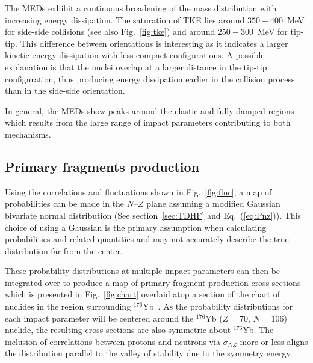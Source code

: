 The MEDs exhibit a continuous broadening of the mass distribution with increasing energy dissipation. 
The saturation of TKE lies around $350-400$~MeV for side-side collisions (see also Fig.~\ref{fig:tke}) and around $250-300$~MeV for tip-tip. 
This difference between orientations is interesting as it indicates a larger kinetic energy dissipation with less compact configurations. 
A possible explanation is that the nuclei overlap at a larger distance in the tip-tip configuration, thus producing energy dissipation earlier in the collision process than in the side-side orientation. 

In general, the MEDs show peaks around the elastic and fully damped regions which results from the large range of impact parameters contributing to both mechanisms.

\subsection{Primary fragments production}

Using the  correlations and fluctuations shown in Fig.~\ref{fig:fluc}, a map of probabilities can be made in the $N$--$Z$ plane assuming a modified Gaussian bivariate normal distribution (See section~\ref{sec:TDHF} and Eq.~(\ref{eq:Pnz})).
This choice of using a Gaussian is the primary assumption when calculating probabilities and related quantities and may not accurately describe the true distribution far from the center.

These probability distributions at multiple impact parameters can then be integrated over to produce a map of primary fragment production cross sections which is presented in Fig.~\ref{fig:chart} overlaid atop a section of the chart of nuclides in the region surrounding $^{176}$Yb~\citep{anu_chart}.
As the probability distributions for each impact parameter will be centered around the $^{176}$Yb ($Z=70$, $N=106$) nuclide, the resulting cross sections are also symmetric about $^{176}$Yb.
The inclusion of correlations between protons and neutrons via $\sigma_{NZ}$ more or less aligns the distribution parallel to the valley of stability  due to the symmetry energy.

